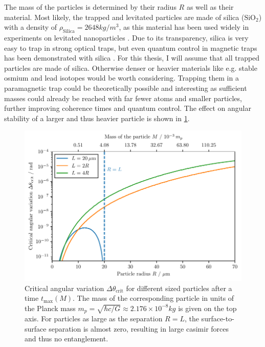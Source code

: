 The mass of the particles is determined by their radius $R$ as well as their material.
Most likely, the trapped and levitated particles are made of silica ($\mathrm{SiO_2}$) with a density of $\rho_\mathrm{Silica} = 2648\si{kg/m^3}$, as this material has been used widely in experiments on levitated nanoparticles \cite{Grass_2016,Slezak_2018}. Due to its transparency, silica is very easy to trap in strong optical traps, but even quantum control in magnetic traps has been demonstrated with silica \cite{Slezak_2018}.
For this thesis, I will assume that all trapped particles are made of silica. Otherwise denser or heavier materials like e.g. stable osmium and lead isotopes would be worth considering.
Trapping them in a paramagnetic trap could be theoretically possible and interesting as sufficient masses could already be reached with far fewer atoms and smaller particles, further improving coherence times and quantum control.
The effect on angular stability of a larger and thus heavier particle is shown in \cref{fig:4:theta-crit-mass}.
\begin{figure}[!htbp]
  \centering
  \includegraphics[width=\textwidth]{./../figures/theta-variance/theta-crit-mass.pdf}
  \caption{Critical angular variation $\Delta \theta_\mathrm{crit}$ for different sized particles after a time $t_\mathrm{max}(M)$. The mass of the corresponding particle in units of the Planck mass $m_p = \sqrt{\hbar c / G} \approx 2.176\times 10^{-8}\si{kg}$ is given on the top axis. For particles as large as the separation $R = L$, the surface-to-surface separation is almost zero, resulting in large casimir forces and thus no entanglement.}
  \label{fig:4:theta-crit-mass}
\end{figure}
